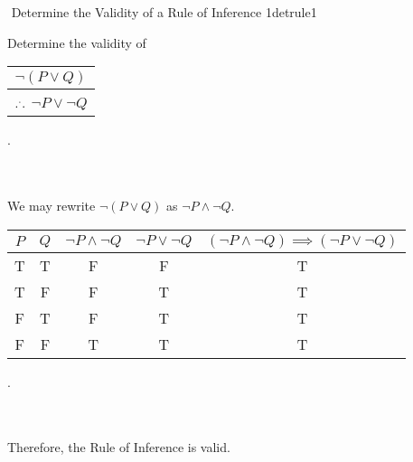         \begin{exercise}{\Difficulty\,\,Determine the Validity of a Rule of Inference 1}{detrule1}
        
            Determine the validity of
            \begin{center}
                \begin{tabular}{c}
                    \hline
                    \(\neg(P\vee Q)\) \\
                    \hline
                    \(.^..\) \(\neg P \vee \neg Q\) \\
                    \hline 
                \end{tabular}.
            \end{center}
            \vphantom
            \\
            \\
            We may rewrite \(\neg(P\vee Q)\) as \(\neg P \wedge \neg Q\).
            \begin{center}
                \begin{tabular}{c|c|c|c|c}
                \hline
                    \(P\) & \(Q\) & \(\neg P \wedge \neg Q\) & \(\neg P \vee \neg Q\) & \((\neg P \wedge \neg Q) \implies (\neg P \vee \neg Q)\)\\
                    \hline
                    T & T & F & F & T \\
                    T & F & F & T & T \\
                    F & T & F & T & T \\
                    F & F & T & T & T \\
                    \hline
                \end{tabular}.
            \end{center}
            \vphantom
            \\
            \\
            Therefore, the Rule of Inference is valid.
        \end{exercise}
        \pagebreak
